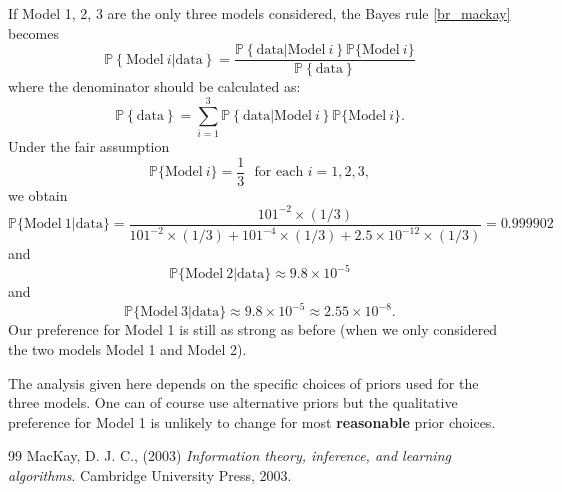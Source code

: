 \documentclass{scrartcl}
\renewcommand{\P}{{\mathbb P}}
\begin{document}
If Model 1, 2, 3 are the only three models considered, the Bayes rule
\eqref{br_mackay} becomes
\begin{equation*}
    \P \left\{\text{Model}~ i | \text{data}  \right\}  = \frac{\P
    \left\{\text{data} | \text{Model}~i \right\} \P\{\text{Model}~i\}}{\P
    \left\{\text{data} \right\}} 
\end{equation*}
where the denominator should be calculated as:
\begin{equation*}
\P \left\{\text{data} \right\} = \sum_{i=1}^3\P
    \left\{\text{data} | \text{Model}~i \right\} \P\{\text{Model}~i\}.   
  \end{equation*}
  Under the fair assumption
  \begin{equation*}
    \P\{\text{Model}~i\} = \frac{1}{3} ~~~\text{for each $i = 1, 2, 3$}, 
  \end{equation*}
  we obtain
  \begin{equation*}
    \P\{\text{Model}~1 | \text{data}\} = \frac{101^{-2} \times
      (1/3)}{101^{-2} \times (1/3) + 101^{-4} \times (1/3) + 2.5
      \times 10^{-12} \times (1/3)} = 0.999902
  \end{equation*}
  and
  \begin{equation*}
    \P\{\text{Model}~2 | \text{data}\} \approx 9.8 \times 10^{-5}
  \end{equation*}
  and
  \begin{equation*}
    \P\{\text{Model}~3 | \text{data}\} \approx 9.8 \times 10^{-5}
    \approx 2.55 \times 10^{-8}. 
  \end{equation*}
 Our preference for Model 1 is still as strong as before (when we only
 considered the two models Model 1 and Model 2).

 The analysis given here depends on the specific choices of priors
 used for the three models. One can of course use alternative priors
 but the qualitative preference for Model 1 is unlikely to change for
 most \textbf{reasonable} prior choices.




\begin{thebibliography}{99}
     MacKay, D. J. C., (2003)
  \textit{Information theory, inference, and learning
    algorithms}. Cambridge University Press, 2003.   

  \end{thebibliography}
\end{document}
